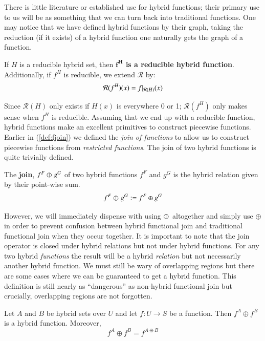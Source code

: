 There is little literature or established use for hybrid functions;
their primary use to us will be as something that we can turn back into traditional functions.
One may notice that we have defined hybrid functions by their graph,
taking the reduction (if it exists) of a hybrid function one naturally gets the graph of a function.


\begin{definition}
	If $H$ is a reducible hybrid set, then \textbf{$\boldsymbol{f^H}$ is a reducible hybrid function}. 
	Additionally, if $f^H$ is reducible, we extend $\mathcal{R}$ by:
	\begin{equation}
		\mathcal{R}(f^H)(x) = f|_{\mathcal{R}(H)}(x)
	\end{equation}
\end{definition}


Since $\mathcal{R}(H)$ only exists if $H(x)$ is everywhere 0 or 1; 
$\mathcal{R}(f^H)$ only makes sense when $f^H$ is reducible.
Assuming that we end up with a reducible function, hybrid functions make an excellent primitives to construct piecewise functions.
Earlier in (\ref{def:fjoin}) we defined the \emph{join of functions} to allow us to construct piecewise functions from \emph{restricted functions}.
The join of two hybrid functions is quite trivially defined.

 
\begin{definition}
	The \textbf{join}, $f^F \varobar^{} g^G$ of two hybrid functions $f^F$ and $g^G$ is 
	the hybrid relation given by their point-wise sum.
	\begin{equation} \label{def:hjoin}
		f^F \varobar^{} g^G := f^F \oplus g^G
	\end{equation}
\end{definition}


However, we will immediately dispense with using $\varobar^{}$ altogether and simply use $\oplus$ 
in order to prevent confusion between hybrid functional join and traditional functional join when they occur together.
It is important to note that the join operator is closed under hybrid relations but not under hybrid functions.
For any two hybrid \emph{functions} the result will be a hybrid \emph{relation} 
but not necessarily another hybrid function.
We must still be wary of overlapping regions but there are some cases where we can be guaranteed to get a hybrid function.
This definition is still nearly as ``dangerous'' as non-hybrid functional join 
but crucially, overlapping regions are not forgotten.


\begin{theorem}
Let $A$ and $B$ be hybrid sets over $U$ and let $f: U \to S$ be a function.
Then $f^A \oplus f^B$ is a hybrid function.
Moreover,
	\begin{equation}
		f^A \oplus f^B = f^{A \oplus B}
	\end{equation}
\end{theorem}



